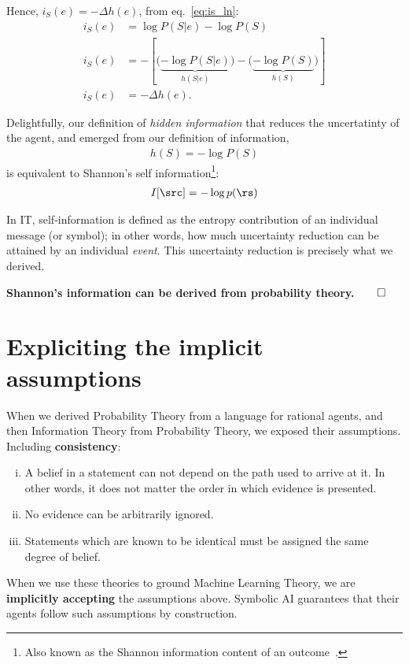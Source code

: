 Hence, \(i_S(e)=-\Delta h(e)\), from eq.~\ref{eq:is_ln}:
\begin{align}
	i_S(e) &= \log{ P(S|e )} - \log {P(S)} \\
	i_S(e) &= - \left[ \biggl(\underbrace{-\log{P(S|e )}}_{h(S|e )}\biggr) - \biggl(\underbrace{-\log{P(S)}}_{h(S)}\biggr) \right] \\
	i_S(e)&=-\Delta h(e).
\end{align}

Delightfully, our definition of \emph{hidden information} that reduces the uncertatinty of the agent, and emerged from our definition of information,
\begin{align}
	h (S) = - \log P(S)
\end{align}
is equivalent to Shannon's self information\footnote{Also known as the Shannon information content of an outcome~.}:
\begin{align}
	I[\src] = - \log p(\rs)
\end{align}

In \acf{IT}, self-information is defined as the entropy contribution of an individual message (or symbol); in other words, how much uncertainty reduction can be attained by an individual \emph{event}. This uncertainty reduction is precisely what we derived.

\textbf{Shannon's information can be derived from probability theory.}\label{sec:probability2information}$\qedhere$

\section{Expliciting the implicit assumptions} When we derived Probability Theory from a language for rational agents, and then Information Theory from Probability Theory, we exposed their assumptions. Including \textbf{consistency}:
\begin{enumerate}
	[i.]
	\item A belief in a statement can not depend on the path used to arrive at it. In other words, it does not matter the order in which evidence is presented.
	\item No evidence can be arbitrarily ignored.
	\item Statements which are known to be identical must be assigned the same degree of belief.
\end{enumerate}

When we use these theories to ground Machine Learning Theory, we are \textbf{implicitly accepting} the assumptions above. Symbolic AI guarantees that their agents follow such assumptions by construction.

